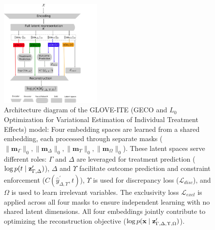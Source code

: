\documentclass[doubleblind]{ecai}
\begin{document}
	
	\begin{figure}[ht]
		\centering
		\includegraphics[width=0.45\textwidth]{Images/arch_5.png}
		\caption{Architecture diagram of the GLOVE-ITE (GECO and $L_0$ Optimization for Variational Estimation of Individual Treatment Effects) model: Four embedding spaces are learned from a shared embedding, each processed through separate masks ($\|\mathbf{m}_{\Gamma}\|_0,\|\mathbf{m}_{\Delta}\|_0,\|\mathbf{m}_{\Upsilon}\|_0,\|\mathbf{m}_{\Omega}\|_0$). These latent spaces serve different roles: $\Gamma$ and $\Delta$ are leveraged for treatment prediction ($\log p(t \mid \bold{z}_{\Gamma,\Delta}^\prime)$), $\Delta$ and $\Upsilon$ facilitate outcome prediction and constraint enforcement ($C(\hat{y}_{\Delta,\Upsilon}^\prime, t)$), $\Upsilon$ is used for discrepancy loss ($\mathcal{L}_\mathit{disc}$), and $\Omega$ is used to learn irrelevant variables. The exclusivity loss $\mathcal{L}_{\mathit{excl}}$ is applied across all four masks to ensure independent learning with no shared latent dimensions. All four embeddings jointly contribute to optimizing the reconstruction objective ($\log p(\mathbf{x} \mid \bold{z}_{\Gamma,\Delta,\Upsilon,\Omega}^\prime)$).}
		
		
		
		
		\label{fig:arch}
	\end{figure}
	
\end{document}

